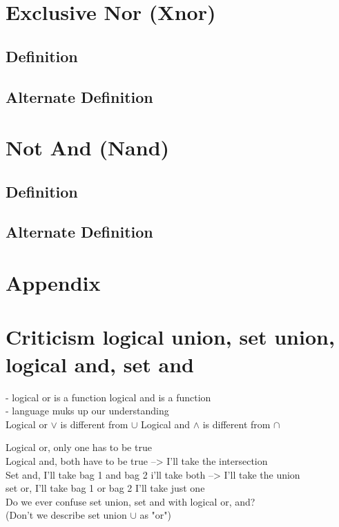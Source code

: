 \documentclass[11pt]{article}
\begin{document}
\newpage
\section{Exclusive Nor (Xnor)}
\subsection{Definition}
\subsection{Alternate Definition}

\section{Not And (Nand)}
\subsection{Definition}
\subsection{Alternate Definition}




\newpage
\section*{Appendix}
\section{Criticism logical union, set union, logical and, set and}
- logical or is a function logical and is a function\\
- language muks up our understanding\\

Logical or $\lor$ is different from $\cup$
Logical and $\land$ is different from $\cap$

Logical or, only one has to be true\\
Logical and, both have to be true --> I'll take the intersection\\

Set and, I'll take bag 1 and bag 2 i'll take both --> I'll take the union\\
set or, I'll take bag 1 or bag 2 I'll take just one\\

Do we ever confuse set union, set and with logical or, and?\\
(Don't we describe set union $\cup$ as "or")
\end{document}

